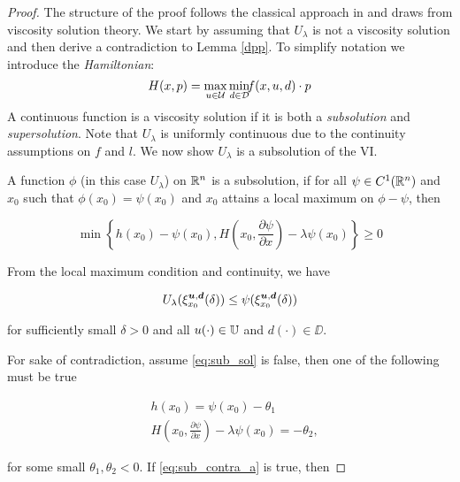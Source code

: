 \begin{for_journal}
\begin{proof}
The structure of the proof follows the classical approach in \cite{Evans1984} and draws from viscosity solution theory. We start by assuming that $U_{\lambda}$ is not a viscosity solution and then derive a contradiction to Lemma \ref{dpp}. To simplify notation we introduce the \emph{Hamiltonian}:
\begin{equation}
H(x,p) = \max_{u\in\mathcal{U}} \min_{ d\in\mathcal{D}} \!\! f(x,u,d)\cdot p
\end{equation}
A continuous function is a viscosity solution if it is both a \emph{subsolution} and \emph{supersolution}. Note that $U_{\lambda}$ is uniformly continuous due to the continuity assumptions on $f$ and $l$. We now show $U_{\lambda}$ is a subsolution of the VI.

\begin{definition} A function $\phi$ (in this case $U_{\lambda}$) on $\mathbb{R}^n$  is a subsolution, if for all $\psi \in C^1(\mathbb{R}^n)$ and $x_0$ such that $\phi(x_0) = \psi(x_0)$ and $x_0$ attains a local maximum on $\phi- \psi$, then

\begin{equation}\label{eq:sub_sol}
    \min\left\{h(x_0)-\psi(x_0), H(x_0,\frac{\partial \psi}{\partial x}) - \lambda \psi(x_0)\right\} \geq 0
\end{equation}
\end{definition}

From the local maximum condition and continuity, we have

\begin{equation*}
U_{\lambda}(\xi_{x_0}^{\bm{u}, \bm{d}}(\delta)) \leq \psi(\xi_{x_0}^{\bm{u}, \bm{d}}(\delta))
\end{equation*}

\noindent for sufficiently small $\delta>0$ and all $u(\cdot) \in \mathbb{U}$ and $d(\cdot) \in \DD$.

For sake of contradiction, assume \eqref{eq:sub_sol} is false, then one of the following must be true

\begin{subequations}
\begin{align}
&h(x_0) = \psi(x_0) - \theta_1 \label{eq:sub_contra_a}\\
&H(x_0,\frac{\partial \psi}{\partial x}) - \lambda \psi(x_0) = -\theta_2 \label{eq:sub_contra_b},
\end{align} 
\end{subequations}

for some small $\theta_1, \theta_2 < 0$. If \eqref{eq:sub_contra_a} is true, then 


\end{proof}
\end{for_journal}
